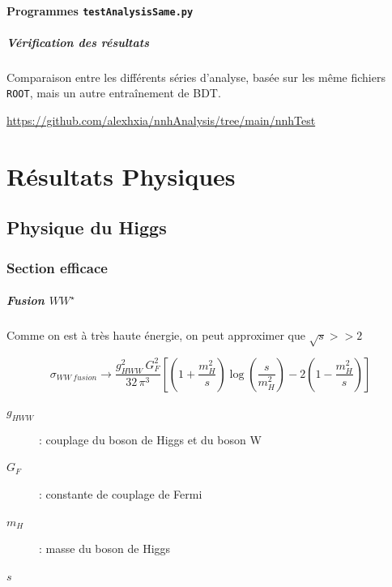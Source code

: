 \documentclass[10pt,a4paper]{report}
\newcommand{\ROOT}{\texttt{ROOT}\xspace}
\newcommand{\Wstar}{W^{\star}}
\begin{document}
\subsubsection{Programmes \texttt{testAnalysisSame.py}}

\paragraph{Vérification des résultats}
Comparaison entre les différents séries d'analyse, basée sur les même fichiers \ROOT, mais un autre entraînement de BDT.

\url{https://github.com/alexhxia/nnhAnalysis/tree/main/nnhTest}


\chapter{Résultats Physiques}

\section{Physique du Higgs}

\subsection{Section efficace}

\paragraph{Fusion $W\Wstar$ \cite{desy}}

Comme on est à très haute énergie, on peut approximer que $ \sqrt{s} >> 2 $

\begin{equation}
	\sigma_{WW\ fusion} \longrightarrow 
		\frac{g_{HWW}^2 \, G_F^2}{32 \, \pi^3}
		\left[
			\left(1 + \frac{m_H^2}{s}\right) \log\left(\frac{s}{m_H^2}\right)
			- 2 \left(1 - \frac{m_H^2}{s}\right)
		\right]
\end{equation}

\begin{description}

	\item[$g_{HWW}$] : couplage du boson de Higgs et du boson W

	\item[$G_F$] : constante de couplage de Fermi
	
	\item[$m_H$] : masse du boson de Higgs
	
	\item[$s$]
		
\end{description}
\end{document}
